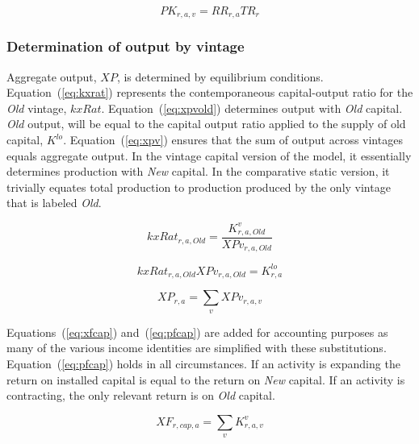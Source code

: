 \documentclass[11pt,letterpaper]{report}
\begin{document}
\begin{equation}
\label{eq:pk}
\mathit{PK}_{r,a,v} = \mathit{RR}_{r,a} \mathit{TR}_r
\end{equation}

\subsubsection{Determination of output by vintage}

Aggregate output, $\mathit{XP}$, is determined by equilibrium conditions.
Equation~(\ref{eq:kxrat}) represents the contemporaneous capital-output ratio
for the \emph{Old} vintage, $\mathit{kxRat}$. Equation~(\ref{eq:xpvold}) determines output with \emph{Old} capital. \emph{Old} output, will be equal to the
capital output ratio applied to the supply of old
capital, $K^{\mathit{lo}}$. Equation~(\ref{eq:xpv}) ensures that the sum
of output across vintages equals aggregate output. In the vintage capital
version of the model, it essentially determines production with \emph{New}
capital. In the comparative static version, it trivially equates total
production to production produced by the only vintage that is labeled
\emph{Old}.

\begin{equation}
\label{eq:kxrat}
\mathit{kxRat}_{r,a,\mathit{Old}} =
   \frac {K^v_{r,a,\mathit{Old}}} {\mathit{XPv}_{r,a,\mathit{Old}}}
\end{equation}

\begin{equation}
\label{eq:xpvold}
\mathit{kxRat}_{r,a,\mathit{Old}} \mathit{XPv}_{r,a,\mathit{Old}} =
K^{\mathit{lo}}_{r,a}
\end{equation}

\begin{equation}
\label{eq:xpv}
\mathit{XP}_{r,a} = \sum_v{ \mathit{XPv}_{r,a,v}}
\end{equation}

Equations~(\ref{eq:xfcap}) and~(\ref{eq:pfcap}) are added for accounting
purposes as many of the various income identities are simplified with these
substitutions. Equation~(\ref{eq:pfcap}) holds in all circumstances. If an
activity is expanding the return on installed capital is equal to the return on
\emph{New} capital. If an activity is contracting, the only relevant return is
on \emph{Old} capital.

\begin{equation}
\label{eq:xfcap}
\mathit{XF}_{r,cap,a} = \sum_v{ \mathit{K}^v_{r,a,v}}
\end{equation}
\end{document}
